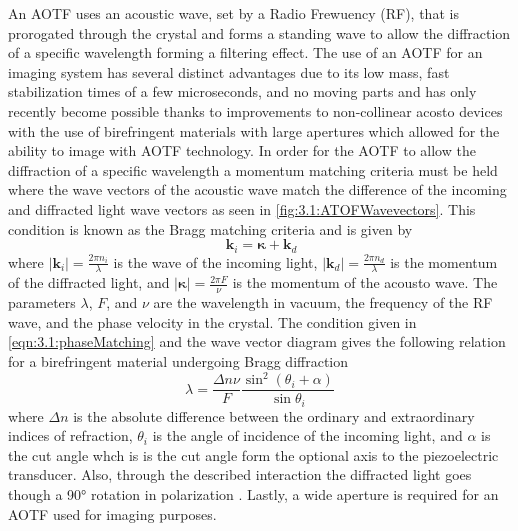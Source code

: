 \documentclass[12pt]{article}
\begin{document}
An AOTF uses an acoustic wave, set by a Radio Frewuency (RF), that is prorogated through the crystal and forms a standing wave to allow the diffraction of a specific wavelength forming a filtering effect. The use of an AOTF for an imaging system has several distinct advantages due to its low mass, fast stabilization times of a few microseconds, and no moving parts and has only recently become possible thanks to improvements to non-collinear acosto devices with the use of birefringent materials with large apertures \citep{Chang1974, Voloshinov2007} which allowed for the ability to image with AOTF technology. In order for the AOTF to allow the diffraction of a specific wavelength a momentum matching criteria must be held where the wave vectors of the acoustic wave match the difference of the incoming and diffracted light wave vectors as seen in \autoref{fig:3.1:ATOFWavevectors}. This condition is known as the Bragg matching criteria and is given by
\begin{equation}
    \ \mathbf{k}_{i} = \boldsymbol\kappa + \mathbf{k}_{d}
    \label{eqn:3.1:phaseMatching}
\end{equation}
where $\left|\mathbf{k}_{i}\right| = \frac{2\pi n_{i}}{\lambda}$ is the wave of the incoming light, $\left|\mathbf{k}_{d}\right| = \frac{2\pi n_{d}}{\lambda}$ is the momentum of the diffracted light, and $\left|\boldsymbol\kappa\right| = \frac{2\pi F}{\nu}$ is the momentum of the acousto wave. The parameters $\lambda$, $F$, and $\nu$ are the wavelength in vacuum, the frequency of the RF wave, and the phase velocity in the crystal. The condition given in \autoref{eqn:3.1:phaseMatching} and the wave vector diagram gives the following relation for a birefringent material undergoing Bragg diffraction
\begin{equation}
    \lambda  = \frac{\Delta n\nu}{F}\frac{\sin^{2}(\theta_{i}+\alpha)}{\sin\theta_{i}}
    \label{eqn:3.1:AOTFWavelengthDependance}
\end{equation}
where $\Delta n$ is the absolute difference between the ordinary and extraordinary indices of refraction, $\theta_{i}$ is the angle of incidence of the incoming light, and $\alpha$ is the cut angle whch is is the cut angle form the optional axis to the piezoelectric transducer. Also, through the described interaction the diffracted light goes though a 90\si{\degree} rotation in polarization \citep{Voloshinov1996}. Lastly, a wide aperture is required for an AOTF used for imaging purposes.
\end{document}
